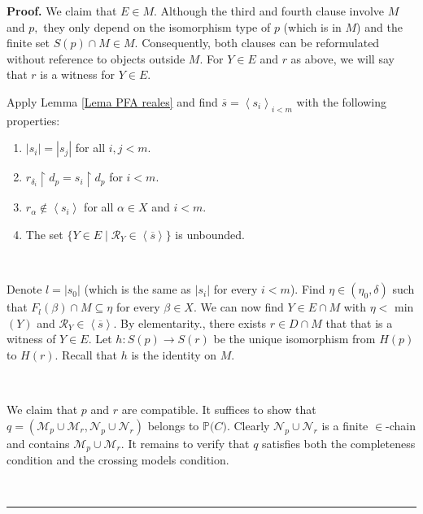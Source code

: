 \documentclass{article}
\newenvironment{proof}[1][Proof]{\noindent\textbf{#1.} }{\ \rule{0.5em}{0.5em}}
\begin{document}
\begin{proof}
We claim that $E\in M.$ Although the third and fourth clause involve $M$ and
$p,$ they only depend on the isomorphism type of $p$ (which is in $M$) and the
finite set $S\left(  p\right)  \cap M\in M.$ Consequently, both clauses can be
reformulated without reference to objects outside $M.$ For $Y\in E$ and $r$ as
above, we will say that $r$ is a witness for $Y\in E.$

\qquad\qquad\qquad\qquad\qquad\qquad

Apply Lemma \ref{Lema PFA reales} and find $\overline{s}=\left\langle
s_{i}\right\rangle _{i<m}$ with the following properties:

\begin{enumerate}
\item $\left\vert s_{i}\right\vert =\left\vert s_{j}\right\vert $ for all
$i,j<m.$

\item $r_{\delta_{i}}\upharpoonright d_{p}=s_{i}\upharpoonright d_{p}$ for
$i<m.$

\item $r_{\alpha}\notin\left\langle s_{i}\right\rangle $ for all $\alpha\in X$
and $i<m.$

\item The set $\{Y\in E\mid\mathcal{R}_{Y}\in\left\langle \overline
{s}\right\rangle \}$ is unbounded.
\end{enumerate}

\qquad\ \ \ 

Denote $l=\left\vert s_{0}\right\vert $ (which is the same as $\left\vert
s_{i}\right\vert $ for every $i<m$). Find $\eta\in\left(  \eta_{0}%
,\delta\right)  $ such that $F_{l}\left(  \beta\right)  \cap M\subseteq\eta$
for every $\beta\in X.$ We can now find $Y\in E\cap M$ with $\eta<$
\textsf{min}$\left(  Y\right)  $ and $\mathcal{R}_{Y}\in\left\langle
\overline{s}\right\rangle .$ By elementarity., there exists $r\in D\cap M$
that that is a witness of $Y\in E.$ Let $h:S\left(  p\right)  \longrightarrow
S\left(  r\right)  $ be the unique isomorphism from $H\left(  p\right)  $ to
$H\left(  r\right)  .$ Recall that $h$ is the identity on $M.$

\qquad\qquad\qquad\ \ \ 

We claim that $p$ and $r$ are compatible. It suffices to show that
$q=(\mathcal{M}_{p}\cup\mathcal{M}_{r},\mathcal{N}_{p}\cup\mathcal{N}_{r})$
belongs to $\mathbb{P(}C\mathbb{)}.$ Clearly $\mathcal{N}_{p}\cup
\mathcal{N}_{r}$ is a finite $\in$-chain and contains $\mathcal{M}_{p}%
\cup\mathcal{M}_{r}.$ It remains to verify that $q$ satisfies both the
completeness condition and the crossing models condition.


\end{proof}
\end{document}
